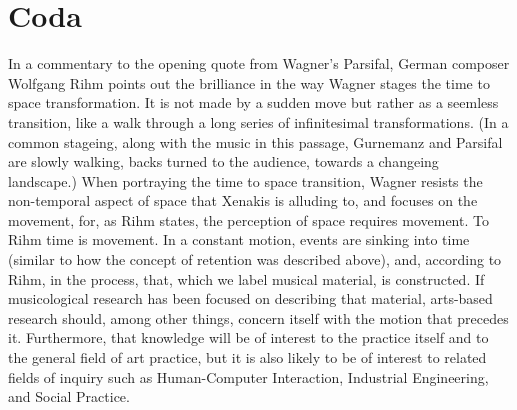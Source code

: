 



\section{Coda}
\label{sec:coda}

In a commentary to the opening quote from Wagner's Parsifal, German composer Wolfgang Rihm points out the brilliance in the way Wagner stages the time to space transformation. It is not made by a sudden move but rather as a seemless transition, like a walk through a long series of infinitesimal transformations. (In a common stageing, along with the music in this passage, Gurnemanz and Parsifal are slowly walking, backs turned to the audience, towards a changeing landscape.) When portraying the time to space transition, Wagner resists the non-temporal aspect of space that Xenakis is alluding to, and focuses on the movement, for, as Rihm states, the perception of space requires movement. \parencite{rihm01} To Rihm time is movement. In a constant motion, events are sinking into time (similar to how the concept of retention was described above), and, according to Rihm, in the process, that, which we label musical material, is constructed. If musicological research has been focused on describing that material, arts-based research should, among other things, concern itself with the motion that precedes it. Furthermore, that knowledge will be of interest to the practice itself and to the general field of art practice, but it is also likely to be of interest to related fields of inquiry such as Human-Computer Interaction, Industrial Engineering, and Social Practice.



